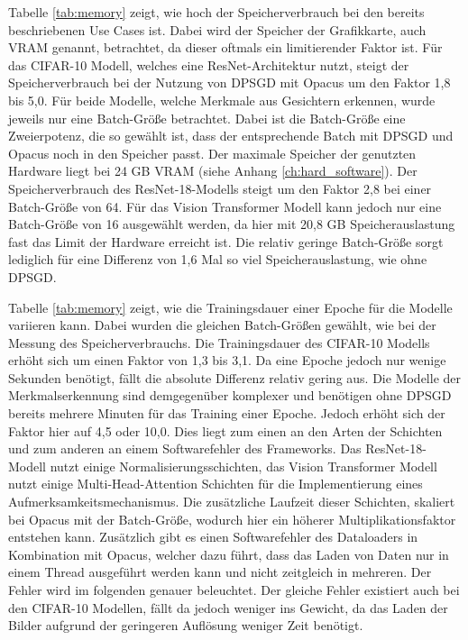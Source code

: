 Tabelle \ref{tab:memory} zeigt, wie hoch der Speicherverbrauch bei den bereits beschriebenen Use Cases ist. 
Dabei wird der Speicher der Grafikkarte, auch VRAM genannt, betrachtet, da dieser oftmals ein limitierender Faktor ist.
Für das CIFAR-10 Modell, welches eine ResNet-Architektur nutzt, steigt der Speicherverbrauch bei der Nutzung von DPSGD mit Opacus um den Faktor 1,8 bis 5,0.
Für beide Modelle, welche Merkmale aus Gesichtern erkennen, wurde jeweils nur eine Batch-Größe betrachtet.
Dabei ist die Batch-Größe eine Zweierpotenz, die so gewählt ist, dass der entsprechende Batch mit DPSGD und Opacus noch in den Speicher passt. 
Der maximale Speicher der genutzten Hardware liegt bei 24 GB VRAM (siehe Anhang \ref{ch:hard_software}).
Der Speicherverbrauch des ResNet-18-Modells steigt um den Faktor 2,8 bei einer Batch-Größe von 64.
Für das Vision Transformer Modell kann jedoch nur eine Batch-Größe von 16 ausgewählt werden, da hier mit 20,8 GB Speicherauslastung fast das Limit der Hardware erreicht ist.
Die relativ geringe Batch-Größe sorgt lediglich für eine Differenz von 1,6 Mal so viel Speicherauslastung, wie ohne DPSGD.


Tabelle \ref{tab:memory} zeigt, wie die Trainingsdauer einer Epoche für die Modelle variieren kann.
Dabei wurden die gleichen Batch-Größen gewählt, wie bei der Messung des Speicherverbrauchs.
Die Trainingsdauer des CIFAR-10 Modells erhöht sich um einen Faktor von 1,3 bis 3,1.
Da eine Epoche jedoch nur wenige Sekunden benötigt, fällt die absolute Differenz relativ gering aus.
Die Modelle der Merkmalserkennung sind demgegenüber komplexer und benötigen ohne DPSGD bereits mehrere Minuten für das Training einer Epoche. 
Jedoch erhöht sich der Faktor hier auf 4,5 oder 10,0. 
Dies liegt zum einen an den Arten der Schichten und zum anderen an einem Softwarefehler des Frameworks.
Das ResNet-18-Modell nutzt einige Normalisierungsschichten, das Vision Transformer Modell nutzt einige Multi-Head-Attention Schichten für die Implementierung eines Aufmerksamkeitsmechanismus.
Die zusätzliche Laufzeit dieser Schichten, skaliert bei Opacus mit der Batch-Größe, wodurch hier ein höherer Multiplikationsfaktor entstehen kann.
Zusätzlich gibt es einen Softwarefehler des Dataloaders in Kombination mit Opacus, welcher dazu führt, dass das Laden von Daten nur in einem Thread ausgeführt werden kann und nicht zeitgleich in mehreren.
Der Fehler wird im folgenden genauer beleuchtet.
Der gleiche Fehler existiert auch bei den CIFAR-10 Modellen, fällt da jedoch weniger ins Gewicht, da das Laden der Bilder aufgrund der geringeren Auflösung weniger Zeit benötigt.


